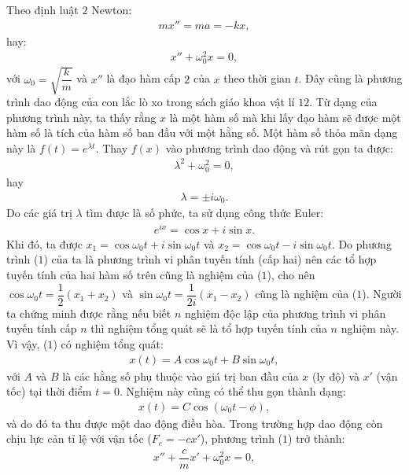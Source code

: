 \begin{multicols}{2}
	\vskip 0.1cm
	Theo định luật $2$ Newton:
	\begin{align*}
		mx''=ma=-kx,
	\end{align*}
	hay:
	\begin{align*}
		x''+\omega_0^2 x=0,		\tag{$1$}
	\end{align*}
	với $\omega_0 = \sqrt{\dfrac{k}{m}}$ và $x''$ là đạo hàm cấp $2$ của $x$ theo thời gian $t$.
	\vskip 0.1cm 
	Đây cũng là phương trình dao động của con lắc lò xo trong sách giáo khoa vật lí $12$.
	\vskip 0.1cm
	Từ dạng của phương trình này, ta thấy rằng $x$ là một hàm số mà khi lấy đạo hàm sẽ được một hàm số là tích của hàm số ban đầu với một hằng số. Một hàm số thỏa mãn dạng này là $f(t) = e^{\lambda t}$. Thay $f(x)$ vào phương trình dao động và rút gọn ta được:
	\begin{align*}
		\lambda^2 + \omega_0^2 = 0,
	\end{align*}
	hay 
	\begin{align*}
		\lambda = \pm i \omega_0.
	\end{align*}
	Do các giá trị $\lambda$ tìm được là số phức, ta sử dụng công thức Euler:
	\begin{align*}
		e^{ix} = \cos x + i \sin x.
	\end{align*}
	Khi đó, ta được $x_1 = \cos\omega_0t + i\sin\omega_0t$ và $x_2 = \cos \omega_0t - i\sin \omega_0t$.
	\vskip 0.1cm
	Do phương trình ($1$) của ta là phương trình vi phân tuyến tính (cấp hai) nên các tổ hợp tuyến tính của hai hàm số trên cũng là nghiệm của ($1$), cho nên $\cos\omega_0t = \dfrac{1}{2}(x_1 + x_2)$ và $\sin \omega_0t = \dfrac{1}{2i}(x_1-x_2)$ cũng là nghiệm của ($1$).
	\vskip 0.1cm
	Người ta chứng minh được rằng nếu biết $n$ nghiệm độc lập của phương trình vi phân tuyến tính cấp $n$ thì nghiệm tổng quát sẽ là tổ hợp tuyến tính của $n$ nghiệm này. Vì vậy, ($1$) có nghiệm tổng quát:
	\begin{align*}
		x(t) = A \cos \omega_0t + B \sin \omega_0t,
	\end{align*}
	với $A$ và $B$ là các hằng số phụ thuộc vào giá trị ban đầu của $x$ (ly độ) và $x'$ (vận tốc) tại thời điểm $t=0$. Nghiệm này cũng có thể thu gọn thành dạng:
	\begin{align*}
		x(t) = C \cos(\omega_0t - \phi),
	\end{align*}
	và do đó ta thu được một dao động điều hòa.
	\vskip 0.1cm
	Trong trường hợp dao động còn chịu lực cản tỉ lệ với vận tốc ($F_c=-cx'$), phương trình ($1$) trở thành:
	\begin{align*}
		x'' + \dfrac{c}{m}x' + \omega_0^2x = 0, \tag{$2$}

\end{align*}
\end{multicols}
